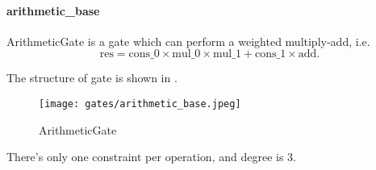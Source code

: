 \paragraph{arithmetic\_base}

ArithmeticGate is a gate which can perform a weighted multiply-add, i.e.
\[ \text{res} = \text{cons\_0} \times \text{mul\_0} \times \text{mul\_1} + \text{cons\_1} \times \text{add}. \]

The structure of gate is shown in .

\begin{figure}[!ht]
    \centering
    \texttt{[image: gates/arithmetic\_base.jpeg]}
    \caption{ArithmeticGate}
    \label{fig:arithmetic-gate}
\end{figure}

There's only one constraint per operation, and degree is 3.
